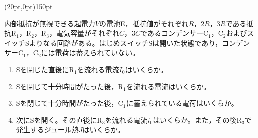 \hakosyokika
\item
    \begin{mawarikomi}(20pt,0pt){150pt}{
        
    }
    内部抵抗が無視できる起電力$V$の電池E，抵抗値がそれぞれ$R$，$2R$，$3R$である抵抗$\mathrm{R_1}$，$\mathrm{R_2}$，$\mathrm{R_3}$，電気容量がそれぞれ$C$，$3C$であるコンデンサー$\mathrm{C_1}$，$\mathrm{C_2}$およびスイッチSよりなる回路がある。はじめスイッチSは開いた状態であり，コンデンサー$\mathrm{C_1}$，$\mathrm{C_2}$には電荷は蓄えられていない。
        \begin{enumerate}
            \item Sを閉じた直後に$\mathrm{R_1}$を流れる電流$I_0$はいくらか。
            \item Sを閉じて十分時間がたった後，$\mathrm{R_1}$を流れる電流はいくらか。
            \item Sを閉じて十分時間がたった後，$\mathrm{C_1}$に蓄えられている電荷はいくらか。
            \item 次にSを開く。その直後に$\mathrm{R_3}$を流れる電流$i_0$はいくらか。また，その後$\mathrm{R_3}$で発生するジュール熱$J$はいくらか。
        \end{enumerate}
    \end{mawarikomi}